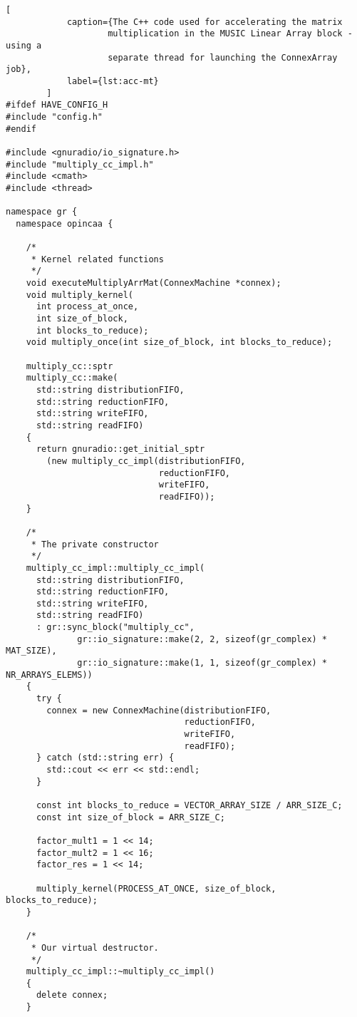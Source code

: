 		\begin{lstlisting}[
		    caption={The C++ code used for accelerating the matrix
                    multiplication in the MUSIC Linear Array block - using a
                    separate thread for launching the ConnexArray job},
		    label={lst:acc-mt}
		]
#ifdef HAVE_CONFIG_H
#include "config.h"
#endif

#include <gnuradio/io_signature.h>
#include "multiply_cc_impl.h"
#include <cmath>
#include <thread>

namespace gr {
  namespace opincaa {

    /*
     * Kernel related functions
     */
    void executeMultiplyArrMat(ConnexMachine *connex);
    void multiply_kernel(
      int process_at_once,
      int size_of_block,
      int blocks_to_reduce);
    void multiply_once(int size_of_block, int blocks_to_reduce);

    multiply_cc::sptr
    multiply_cc::make(
      std::string distributionFIFO,
      std::string reductionFIFO,
      std::string writeFIFO,
      std::string readFIFO)
    {
      return gnuradio::get_initial_sptr
        (new multiply_cc_impl(distributionFIFO,
                              reductionFIFO,
                              writeFIFO,
                              readFIFO));
    }

    /*
     * The private constructor
     */
    multiply_cc_impl::multiply_cc_impl(
      std::string distributionFIFO,
      std::string reductionFIFO,
      std::string writeFIFO,
      std::string readFIFO)
      : gr::sync_block("multiply_cc",
              gr::io_signature::make(2, 2, sizeof(gr_complex) * MAT_SIZE),
              gr::io_signature::make(1, 1, sizeof(gr_complex) * NR_ARRAYS_ELEMS))
    {
      try {
        connex = new ConnexMachine(distributionFIFO,
                                   reductionFIFO,
                                   writeFIFO,
                                   readFIFO);
      } catch (std::string err) {
        std::cout << err << std::endl;
      }

      const int blocks_to_reduce = VECTOR_ARRAY_SIZE / ARR_SIZE_C;
      const int size_of_block = ARR_SIZE_C;

      factor_mult1 = 1 << 14;
      factor_mult2 = 1 << 16;
      factor_res = 1 << 14;

      multiply_kernel(PROCESS_AT_ONCE, size_of_block, blocks_to_reduce);
    }

    /*
     * Our virtual destructor.
     */
    multiply_cc_impl::~multiply_cc_impl()
    {
      delete connex;
    }


\end{lstlisting}
